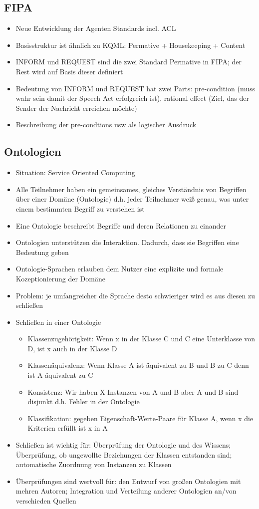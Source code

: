 \documentclass{article} %
\begin{document}
	\subsection{FIPA}
	\begin{itemize}
		\item Neue Entwicklung der Agenten Standards incl. ACL
		\item Basisstruktur ist ähnlich zu KQML: Permative + Housekeeping + Content
		\item INFORM und REQUEST sind die zwei Standard Permative in FIPA; der Rest wird auf Basis dieser definiert
		\item Bedeutung von INFORM und REQUEST hat zwei Parts: pre-condition (muss wahr sein damit der Speech Act erfolgreich ist), rational effect (Ziel, das der Sender der Nachricht erreichen möchte)
		\item Beschreibung der pre-condtions usw als logischer Ausdruck
	\end{itemize}
	\subsection{Ontologien}
	\begin{itemize}
		\item Situation: Service Oriented Computing
		\item Alle Teilnehmer haben ein gemeinsames, gleiches Verständnis von Begriffen über einer Domäne (Ontologie) d.h. jeder Teilnehmer weiß genau, was unter einem bestimmten Begriff zu verstehen ist
		\item Eine Ontologie beschreibt Begriffe und deren Relationen zu einander
		\item Ontologien unterstützen die Interaktion. Dadurch, dass sie Begriffen eine Bedeutung geben
		\item Ontologie-Sprachen erlauben dem Nutzer eine explizite und formale Kozeptionierung der Domäne
		\item Problem: je umfangreicher die Sprache desto schwieriger wird es aus diesen zu schließen
		\item Schließen in einer Ontologie
		\begin{itemize}
			\item Klassenzugehörigkeit: Wenn x in der Klasse C und C eine Unterklasse von D, ist x auch in der Klasse D
			\item Klassenäquivalenz: Wenn Klasse A ist äquivalent zu B und B zu C denn ist A äquivalent zu C
			\item Konsistenz: Wir haben X Instanzen von A und B aber  A und B sind disjunkt d.h. Fehler in der Ontologie
			\item Klassifikation: gegeben Eigenschaft-Werte-Paare für Klasse A, wenn x die Kriterien erfüllt ist x in A
		\end{itemize}
		\item Schließen ist wichtig für: Überprüfung der Ontologie und des Wissens; Überprüfung, ob ungewollte Beziehungen der Klassen entstanden sind; automatische Zuordnung von Instanzen zu Klassen
		\item Überprüfungen sind wertvoll für: den Entwurf von großen Ontologien mit mehren Autoren; Integration und Verteilung anderer Ontologien an/von verschieden Quellen
	\end{itemize}
\end{document}
